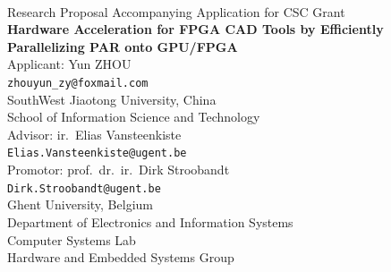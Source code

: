 \documentclass[a4paper,oneside,12pt]{article}
\begin{document}

\thispagestyle{empty}

\begin{center}
\mbox{}\\\vspace{5mm}
{\large Research Proposal Accompanying Application for CSC Grant}\\ [45mm]
%
{\bf\Large Hardware Acceleration for FPGA CAD Tools by Efficiently Parallelizing PAR onto GPU/FPGA} \\
\vspace{45mm}
\large Applicant: Yun ZHOU \\
\vspace{2mm}
\small\texttt{zhouyun\_zy@foxmail.com} \\
\vspace{10mm}
\normalsize SouthWest Jiaotong University, China \\
\normalsize School of Information Science and Technology\\
\vspace{10mm}
\large Advisor: ir.\ Elias Vansteenkiste \\
\small\texttt{Elias.Vansteenkiste@ugent.be} \\
\vspace{2mm}
\large Promotor: prof.\ dr.\ ir.\ Dirk Stroobandt \\
\small\texttt{Dirk.Stroobandt@ugent.be} \\
\vspace{10mm}
\normalsize Ghent University, Belgium \\
\normalsize Department of Electronics and Information Systems\\
\normalsize Computer Systems Lab\\
\normalsize Hardware and Embedded Systems Group
\end{center}

\newpage

\tableofcontents
\end{document}
